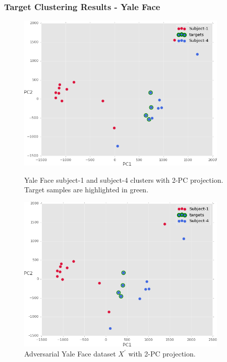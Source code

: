 \documentclass{beamer}
\begin{document}
\begin{frame}
	\frametitle{Target Clustering Results - Yale Face}
	
	\begin{figure}[H]
		\begin{minipage}[t]{0.45\linewidth}
			\centering
			\includegraphics[width=0.9\textwidth]{img/target/pcaYale.png}
			\caption{\footnotesize Yale Face subject-1 and subject-4 clusters with 2-PC projection. Target samples are highlighted in green.}
		\end{minipage}        
		\hspace{.1cm}
		\begin{minipage}[t]{0.45\linewidth}
			\centering
			\includegraphics[width=0.9\textwidth]{img/target/pcaYaleadv.png}
			\caption{\footnotesize Adversarial Yale Face dataset $X^\prime$ with 2-PC projection.}

\end{minipage}
\end{figure}
\end{frame}
\end{document}
